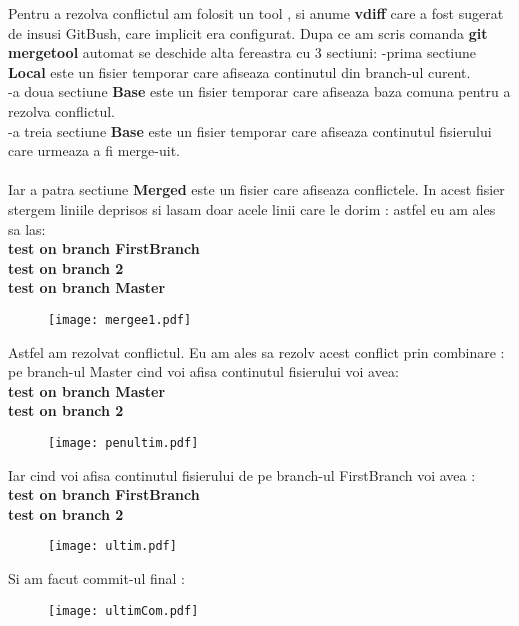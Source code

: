 \tab Pentru a rezolva conflictul am folosit un tool , si anume \textbf{vdiff} care a fost sugerat de insusi GitBush, care implicit era configurat. Dupa ce am scris comanda \textbf{git mergetool} automat se deschide alta fereastra cu 3 sectiuni:
-prima sectiune \textbf{Local} este un fisier temporar care afiseaza continutul din branch-ul curent. \\
-a doua sectiune \textbf{Base} este un fisier temporar care afiseaza baza comuna pentru a rezolva conflictul.\\
-a treia sectiune \textbf{Base} este un fisier temporar care afiseaza continutul fisierului care urmeaza a fi merge-uit.\\
\\
Iar a patra sectiune \textbf{Merged} este un fisier care afiseaza conflictele. In acest fisier stergem liniile deprisos si lasam doar acele linii care le dorim : astfel eu am ales sa las:\\
\textbf{test on branch FirstBranch\\
test on branch 2\\
test on branch Master}
\begin{figure}[h]
\centering
\texttt{[image: mergee1.pdf]}
\end{figure}
\cleardoublepage
\tab Astfel am rezolvat conflictul. Eu am ales sa rezolv acest conflict prin combinare : pe branch-ul Master cind voi afisa continutul fisierului voi avea:\\
\textbf{test on branch Master\\
test on branch 2\\}
\begin{figure}[h]
\centering
\texttt{[image: penultim.pdf]}
\end{figure}

\tab Iar cind voi afisa continutul fisierului de pe branch-ul FirstBranch voi avea : \\
\textbf{test on branch FirstBranch\\
test on branch 2\\}
\begin{figure}[h]
\centering
\texttt{[image: ultim.pdf]}
\end{figure}
\cleardoublepage

\tab Si am facut commit-ul final : 
\begin{figure}[h]
\centering
\texttt{[image: ultimCom.pdf]}
\end{figure}